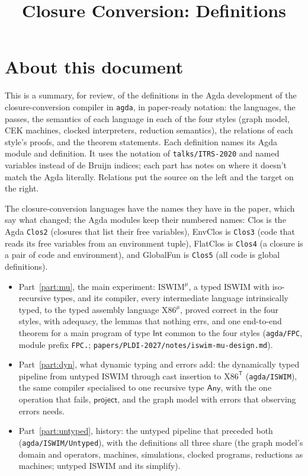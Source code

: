 \documentclass[10pt]{article}
\title{Closure Conversion: Definitions}
\author{}
\date{}
\theoremstyle{acmplain}
\newcommand{\key}[1]{\mathsf{#1}}
\newcommand{\Tl}[1]{\textrm{#1}^{\mathsf{T}}}  %
\newcommand{\TAny}{\key{Any}}
\newcommand{\Ml}[1]{\textrm{#1}^{\mu}}                  %
\begin{document}
\maketitle
\tableofcontents

\section*{About this document}

This is a summary, for review, of the definitions in the Agda development
of the closure-conversion compiler in \texttt{agda}, in paper-ready
notation: the languages, the passes, the semantics of each language in each
of the four styles (graph model, CEK machines, clocked interpreters,
reduction semantics), the relations of each style's proofs, and the theorem
statements. Each definition names its Agda module and definition. It uses
the notation of \texttt{talks/ITRS-2020} and named variables instead of de
Bruijn indices; each part has notes on where it doesn't match the Agda
literally. Relations put the source on the left and the target on the
right.

The closure-conversion languages have the names they have in the paper,
which say what changed; the Agda modules keep their numbered names:
Clos is the Agda \texttt{Clos2} (closures that list their free
variables), EnvClos is \texttt{Clos3} (code that reads its free
variables from an environment tuple), FlatClos is \texttt{Clos4} (a
closure is a pair of code and environment), and GlobalFun is
\texttt{Clos5} (all code is global definitions).

\begin{itemize}
\item Part~\ref{part:mu}, the main experiment: $\Ml{ISWIM}$, a typed ISWIM
  with iso-recursive types, and its compiler, every intermediate language
  intrinsically typed, to the typed assembly language $\Ml{X86}$, proved
  correct in the four styles, with adequacy, the lemmas that nothing errs,
  and one end-to-end theorem for a main program of type $\key{Int}$ common
  to the four styles (\texttt{agda/FPC}, module prefix \texttt{FPC.};
  \texttt{papers/PLDI-2027/notes/iswim-mu-design.md}).
\item Part~\ref{part:dyn}, what dynamic typing and errors add: the
  dynamically typed pipeline from untyped ISWIM through cast insertion to
  $\Tl{X86}$ (\texttt{agda/ISWIM}), the same compiler specialised to one
  recursive type $\TAny$, with the one operation that fails,
  $\key{project}$, and the graph model with errors that observing errors
  needs.
\item Part~\ref{part:untyped}, history: the untyped pipeline that preceded
  both (\texttt{agda/ISWIM/Untyped}), with the definitions all three share (the
  graph model's domain and operators, machines, simulations, clocked
  programs, reductions as machines; untyped ISWIM and its simplify).
\end{itemize}
\end{document}
